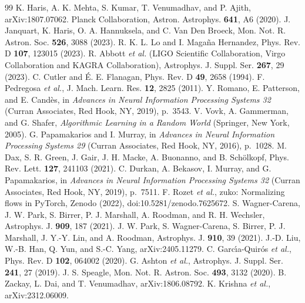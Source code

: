 \begin{thebibliography}{99}
K. Haris, A. K. Mehta, S. Kumar, T. Venumadhav, and P. Ajith, arXiv:1807.07062.
Planck Collaboration, Astron. Astrophys. \textbf{641}, A6 (2020).
J. Janquart, K. Haris, O. A. Hannuksela, and C. Van Den Broeck, Mon. Not. R. Astron. Soc. \textbf{526}, 3088 (2023).
R. K. L. Lo and I. Maga{\~n}a Hernandez, Phys. Rev. D \textbf{107}, 123015 (2023).
R. Abbott \textit{et al.} (LIGO Scientific Collaboration, Virgo Collaboration and KAGRA Collaboration), Astrophys. J. Suppl. Ser. \textbf{267}, 29 (2023).
C. Cutler and {\'E}. E. Flanagan, Phys. Rev. D \textbf{49}, 2658 (1994).
F. Pedregosa \textit{et al.}, J. Mach. Learn. Res. \textbf{12}, 2825 (2011).
Y. Romano, E. Patterson, and E. Cand{\`e}s, in \textit{Advances in Neural Information Processing Systems 32} (Curran Associates, Red Hook, NY, 2019), p.~3543.
V. Vovk, A. Gammerman, and G. Shafer, \textit{Algorithmic Learning in a Random World} (Springer, New York, 2005).
G. Papamakarios and I. Murray, in \textit{Advances in Neural Information Processing Systems 29} (Curran Associates, Red Hook, NY, 2016), p.~1028.
M. Dax, S. R. Green, J. Gair, J. H. Macke, A. Buonanno, and B. Sch{\"o}lkopf, Phys. Rev. Lett. \textbf{127}, 241103 (2021).
C. Durkan, A. Bekasov, I. Murray, and G. Papamakarios, in \textit{Advances in Neural Information Processing Systems 32} (Curran Associates, Red Hook, NY, 2019), p.~7511.
F. Rozet \textit{et al.}, zuko: Normalizing flows in PyTorch, Zenodo (2022), doi:10.5281/zenodo.7625672.
S. Wagner-Carena, J. W. Park, S. Birrer, P. J. Marshall, A. Roodman, and R. H. Wechsler, Astrophys. J. \textbf{909}, 187 (2021).
J. W. Park, S. Wagner-Carena, S. Birrer, P. J. Marshall, J. Y.-Y. Lin, and A. Roodman, Astrophys. J. \textbf{910}, 39 (2021).
J.-D. Liu, W.-B. Han, Q. Yun, and S.-C. Yang, arXiv:2405.11279.
C. Garc{\'\i}a-Quir{\'o}s \textit{et al.}, Phys. Rev. D \textbf{102}, 064002 (2020).
G. Ashton \textit{et al.}, Astrophys. J. Suppl. Ser. \textbf{241}, 27 (2019).
J. S. Speagle, Mon. Not. R. Astron. Soc. \textbf{493}, 3132 (2020).
B. Zackay, L. Dai, and T. Venumadhav, arXiv:1806.08792.
K. Krishna \textit{et al.}, arXiv:2312.06009.


\end{thebibliography}
